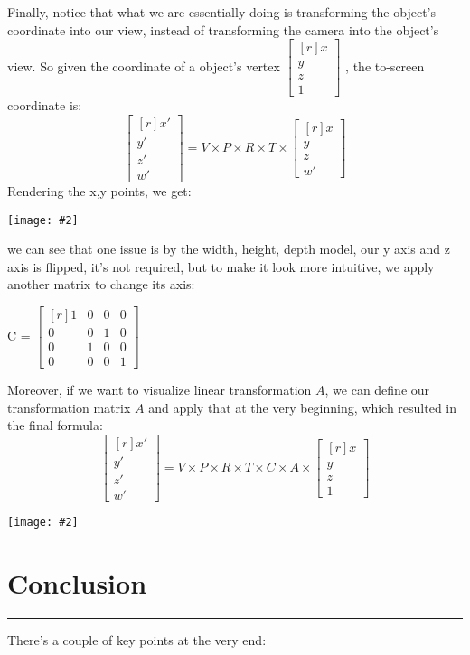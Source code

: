 \documentclass[11pt]{article}
\newcommand{\image}[2]{\texttt{[image: \#2]}}
\newcommand{\mysection}[1]{
    \section*{#1}
    \hrule
    \vspace*{0.5cm}
}
\newcommand{\mat}[1]{
    $\begin{bmatrix*}[r]
        #1
    \end{bmatrix*}$
} %
\newcommand{\ilmat}[1]{
    \begin{bmatrix*}[r]
        #1
    \end{bmatrix*}
} %
\begin{document}
Finally, notice that what we are essentially doing is transforming the object's coordinate into our view, instead of transforming the camera into the object's view. So given the coordinate of a object's vertex \mat{x\\y\\z\\1}, the to-screen coordinate is:
\begin{equation*}
    \ilmat{x'\\y'\\z'\\w'} = V\times P\times R\times T \times \ilmat{x\\y\\z\\w'}
\end{equation*}
Rendering the x,y points, we get:
\begin{center}
    \image{0.45}{to-screen_1}
\end{center}
we can see that one issue is by the width, height, depth model, our y axis and z axis is flipped, it's not required, but to make it look more intuitive, we apply another matrix to change its axis:
\begin{center}
    C = \mat{
        1 & 0 & 0 & 0 \\
        0 & 0 & 1 & 0 \\
        0 & 1 & 0 & 0 \\
        0 & 0 & 0 & 1
    }
\end{center}
Moreover, if we want to visualize linear transformation $A$, we can define our transformation matrix $A$ and apply that at the very beginning, which resulted in the final formula:
\begin{equation*}
    \ilmat{x'\\y'\\z'\\w'} = V\times P\times R\times T \times C\times A \times \ilmat{x\\y\\z\\1}
\end{equation*}
\begin{center}
    \image{0.7}{to-screen_2}
\end{center}
\mysection{Conclusion}
There's a couple of key points at the very end:
\end{document}
